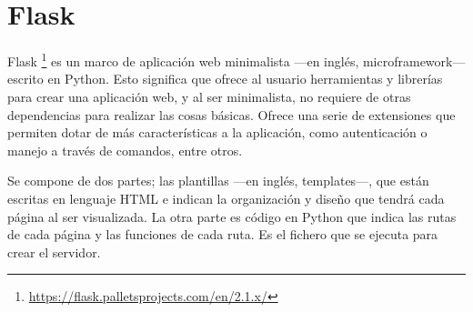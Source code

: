 \section{Flask}
\label{sec:flask}
Flask \footnote{\url{https://flask.palletsprojects.com/en/2.1.x/}} es un marco de aplicación web minimalista ---en inglés, microframework--- escrito en Python. Esto significa que ofrece al usuario herramientas y librerías para crear una aplicación web, y al ser minimalista, no requiere de otras dependencias para realizar las cosas básicas. Ofrece una serie de extensiones que permiten dotar de más características a la aplicación, como autenticación o manejo a través de comandos, entre otros.

Se compone de dos partes; las plantillas ---en inglés, templates---, que están escritas en lenguaje HTML e indican la organización y diseño que tendrá cada página al ser visualizada. La otra parte es código en Python que indica las rutas de cada página y las funciones de cada ruta. Es el fichero que se ejecuta para crear el servidor.\\


